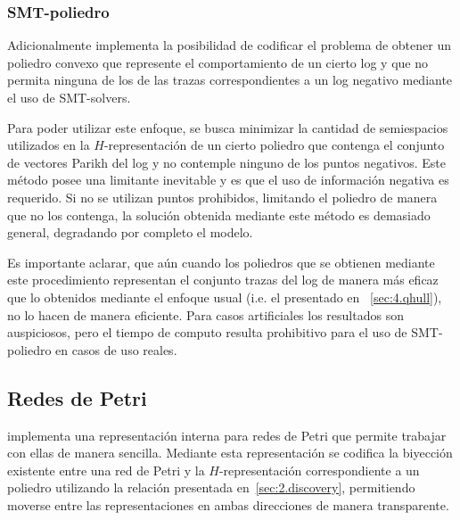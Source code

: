 \subsubsection{SMT-poliedro}
\label{sec:4.smthull}

Adicionalmente \pachtool implementa la posibilidad de codificar el problema de obtener un 
poliedro convexo que represente el comportamiento de un cierto log y que no permita ninguna de los 
de las trazas correspondientes a un log negativo mediante el uso de SMT-solvers.

Para poder utilizar este enfoque, se busca minimizar la cantidad de semiespacios utilizados
en la $H$-representación de un cierto poliedro que contenga el conjunto de vectores Parikh
del log y no contemple ninguno de los puntos negativos.
Este método posee una limitante inevitable y es que el uso de información negativa es requerido.
Si no se utilizan puntos prohibidos, limitando el poliedro de manera que no los contenga,
la solución obtenida mediante este método es demasiado general, degradando por completo el modelo.

Es importante aclarar, que aún cuando los poliedros que se obtienen mediante este procedimiento 
representan el conjunto trazas del log de manera más eficaz que lo obtenidos mediante el 
enfoque usual (i.e. el presentado en ~\autoref{sec:4.qhull}), no lo hacen de manera eficiente.
Para casos artificiales los resultados son auspiciosos, pero el tiempo de computo
resulta prohibitivo para el uso de SMT-poliedro en casos de uso reales.

\subsection{Redes de Petri}
\label{sec:4.petri}

\pachtool implementa una representación interna para redes de Petri que permite trabajar con ellas de manera sencilla.
Mediante esta representación se codifica la biyección existente entre una red de Petri y la $H$-representación 
correspondiente a un poliedro utilizando la relación presentada en~\autoref{sec:2.discovery}, permitiendo
moverse entre las representaciones en ambas direcciones de manera transparente.

